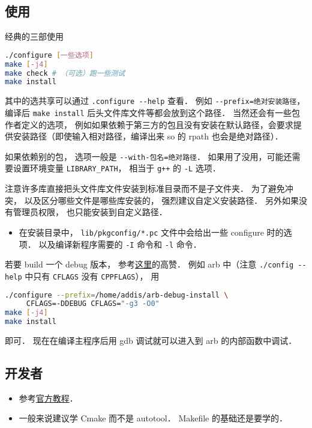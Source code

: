 
\begin{issues}
\issueDraft
\end{issues}



\subsection{使用}
经典的三部使用
\begin{lstlisting}[language=bash]
./configure [一些选项]
make [-j4]
make check # （可选）跑一些测试
make install
\end{lstlisting}
其中的选共享可以通过 \verb|.configure --help| 查看． 例如 \verb|--prefix=绝对安装路径|， 编译后 \verb|make install| 后头文件库文件等都会放到这个路径． 当然还会有一些包作者定义的选项， 例如如果依赖于第三方的包且没有安装在默认路径，会要求提供安装路径（即使输入相对路径，编译出来 so 的 rpath 也会是绝对路径）．

如果依赖别的包， 选项一般是 \verb|--with-包名=绝对路径|． 如果用了没用，可能还需要设置环境变量 \verb|LIBRARY_PATH|， 相当于 \verb|g++| 的 \verb|-L| 选项．

注意许多库直接把头文件库文件安装到标准目录而不是子文件夹． 为了避免冲突， 以及区分哪些文件是哪些库安装的， 强烈建议自定义安装路径． 另外如果没有管理员权限， 也只能安装到自定义路径．

\begin{itemize}
\item 在安装目录中， \verb|lib/pkgconfig/*.pc| 文件中会给出一些 configure 时的选项． 以及编译新程序需要的 \verb|-I| 命令和 \verb|-l| 命令．
\end{itemize}

若要 build 一个 debug 版本， 参考\href{https://stackoverflow.com/questions/4553735/gnu-autotools-debug-release-targets}{这里}的高赞． 例如 arb 中（注意 \verb|./config --help| 中只有 \verb|CFLAGS| 没有 \verb|CPPFLAGS|）， 用
\begin{lstlisting}[language=bash]
./configure --prefix=/home/addis/arb-debug-install \
     CFLAGS=-DDEBUG CFLAGS="-g3 -O0"
make [-j4]
make install
\end{lstlisting}
即可． 现在在编译主程序后用 gdb 调试就可以进入到 arb 的内部函数中调试．

\subsection{开发者}
\begin{itemize}
\item 参考\href{https://www.gnu.org/software/automake/manual/html_node/Autotools-Introduction.html}{官方教程}．
\item 一般来说建议学 Cmake\upref{CMakeN} 而不是 autotool． Makefile 的基础还是要学的．
\end{itemize}
